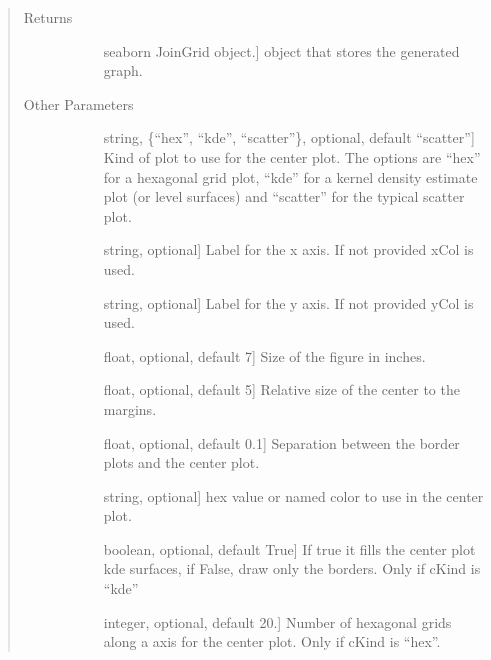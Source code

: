 \documentclass[letterpaper,10pt,english]{sphinxmanual}
\begin{document}
\begin{fulllineitems}
\begin{quote}
\begin{description}
\item[{Returns}] \leavevmode\begin{description}
\item[{}] \leavevmode{[}seaborn JoinGrid object.{]}
object that stores the generated graph.

\end{description}

\item[{Other Parameters}] \leavevmode\begin{description}
\item[{}] \leavevmode{[}string, \{“hex”, “kde”, “scatter”\}, optional, default “scatter”{]}
Kind of plot to use for the center plot. 
The options are “hex” for a hexagonal grid plot, 
“kde” for a kernel density estimate plot (or level surfaces) 
and “scatter” for the typical scatter plot.

\item[{}] \leavevmode{[}string, optional{]}
Label for the x axis. If not provided xCol is used.

\item[{}] \leavevmode{[}string, optional{]}
Label for the y axis. If not provided yCol is used.

\item[{}] \leavevmode{[}float, optional, default 7{]}
Size of the figure in inches.

\item[{}] \leavevmode{[}float, optional, default 5{]}
Relative size of the center to the margins.

\item[{}] \leavevmode{[}float, optional, default 0.1{]}
Separation between the border plots and the center plot.

\item[{}] \leavevmode{[}string, optional{]}
hex value or named color to use in the center plot.

\item[{}] \leavevmode{[}boolean, optional, default True{]}
If true it fills the center plot kde surfaces, 
if False, draw only the borders. Only if cKind is “kde”

\item[{}] \leavevmode{[}integer, optional, default 20.{]}
Number of hexagonal grids along a axis for the center plot.
Only if cKind is “hex”.


\end{description}
\end{description}
\end{quote}
\end{fulllineitems}
\end{document}
